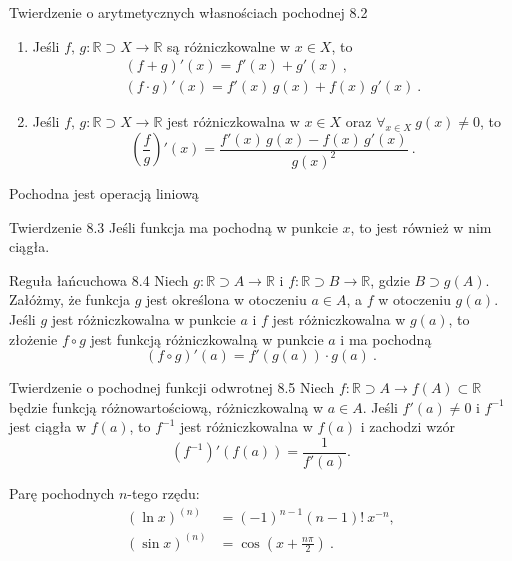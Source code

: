\documentclass{article}
\newcommand{\R}{\mathbb{R}}
\begin{document}
\begin{twier}{Twierdzenie o arytmetycznych własnościach pochodnej 8.2}
\begin{enumerate}[label=\Roman*.]
    \item Jeśli $f,\, g:\R\supset X\to\R$ są różniczkowalne w $x\in X$, to
    \begin{gather}
        (f+g)'(x)=f'(x)+g'(x)\ ,\\(f\cdot g)'(x)=f'(x)\,g(x)+f(x)\,g'(x)\ .
    \end{gather}
    \item Jeśli $f,\,g:\R\supset X\to\R$ jest różniczkowalna w $x\in X$ oraz $\forall_{x\in X}\ g(x)\neq 0$, to
    \begin{equation*}
        \left(\frac{f}{g}\right)'(x)=\frac{f'(x)\,g(x)-f(x)\,g'(x)}{g(x)^2}\ .
    \end{equation*}
\end{enumerate}
\end{twier}

Pochodna jest operacją liniową

\begin{twier}{Twierdzenie 8.3}
    Jeśli funkcja ma pochodną w punkcie $x$, to jest również w nim ciągła. 
\end{twier}

\begin{twier}{Reguła łańcuchowa 8.4}
Niech $g:\R\supset A\to\R$ i $f:\R\supset B\to\R$, gdzie $B\supset g(A)$.
Załóżmy, że funkcja $g$ jest określona w otoczeniu $a\in A$, a $f$ w otoczeniu $g(a)$.
Jeśli $g$ jest różniczkowalna w punkcie $a$ i $f$ jest różniczkowalna w $g(a)$, to złożenie
$f\circ g$ jest funkcją różniczkowalną w punkcie $a$ i ma pochodną
\begin{equation*}
    (f\circ g)'(a)=f'(g(a))\cdot g(a)\ .
\end{equation*}
\end{twier}

\begin{twier}{Twierdzenie o pochodnej funkcji odwrotnej 8.5}
    Niech $f:\R\supset A\to f(A)\subset \R$ będzie funkcją różnowartościową, różniczkowalną w $a\in A$.
    Jeśli $f'(a)\ne0$ i $f^{-1}$ jest ciągła w $f(a)$, to $f^{-1}$ jest różniczkowalna w $f(a)$ i zachodzi wzór
    \begin{equation*}
        \left( f^{-1} \right)'(f(a))=\frac{1}{f'(a)}.
    \end{equation*}
\end{twier}
\bigskip

Parę pochodnych $n$-tego rzędu:
\begin{align}
    (\ln{x})^{(n)}&=(-1)^{n-1}(n-1)!\ x^{-n},\\
    (\sin{x})^{(n)}&=\cos{\left(x+\frac{n\pi}{2}\right)}\ .
\end{align}\bigskip
\end{document}

